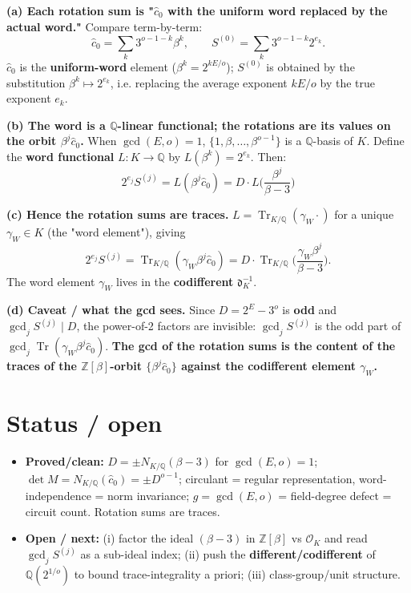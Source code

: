 \documentclass[11pt]{article}
\begin{document}
\textbf{(a) Each rotation sum is "$\hat c_0$ with the uniform word replaced by the actual word."} Compare term-by-term:
\[
\hat c_0 = \sum_{k} 3^{o-1-k} \beta^{k}, \qquad S^{(0)} = \sum_{k} 3^{o-1-k} 2^{e_k}.
\]
$\hat c_0$ is the \textbf{uniform-word} element ($\beta^k=2^{kE/o}$); $S^{(0)}$ is obtained by the substitution $\beta^{k}\mapsto 2^{e_k}$, i.e. replacing the average exponent $kE/o$ by the true exponent $e_k$.

\textbf{(b) The word is a $\mathbb Q$-linear functional; the rotations are its values on the orbit $\beta^j\hat c_0$.} When $\gcd(E,o)=1$, $\{1,\beta,\dots,\beta^{o-1}\}$ is a $\mathbb Q$-basis of $K$. Define the \textbf{word functional} $L:K\to\mathbb Q$ by $L(\beta^k)=2^{e_k}$. Then:
\[
\boxed{2^{e_j} S^{(j)} = L(\beta^{j} \hat c_0) = D \cdot L\Big(\frac{\beta^{j}}{\beta-3}\Big)}
\]

\textbf{(c) Hence the rotation sums are traces.} $L=\operatorname{Tr}_{K/\mathbb Q}(\gamma_W \cdot)$ for a unique $\gamma_W \in K$ (the "word element"), giving
\[
2^{e_j} S^{(j)} = \operatorname{Tr}_{K/\mathbb Q}(\gamma_W \beta^{j} \hat c_0) = D \cdot \operatorname{Tr}_{K/\mathbb Q}\Big(\frac{\gamma_W \beta^{j}}{\beta-3}\Big).
\]
The word element $\gamma_W$ lives in the \textbf{codifferent} $\mathfrak d_K^{-1}$.

\textbf{(d) Caveat / what the gcd sees.} Since $D=2^E-3^o$ is \textbf{odd} and $\gcd_j S^{(j)} \mid D$, the power-of-2 factors are invisible: $\gcd_j S^{(j)}$ is the odd part of $\gcd_j \operatorname{Tr}(\gamma_W \beta^j \hat c_0)$. \textbf{The gcd of the rotation sums is the content of the traces of the $\mathbb Z[\beta]$-orbit $\{\beta^j\hat c_0\}$ against the codifferent element $\gamma_W$.}

\section{Status / open}

\begin{itemize}
    \item \textbf{Proved/clean:} $D=\pm N_{K/\mathbb Q}(\beta-3)$ for $\gcd(E,o)=1$; $\det M=N_{K/\mathbb Q}(\hat c_0) = \pm D^{o-1}$; circulant = regular representation, word-independence = norm invariance; $g=\gcd(E,o)$ = field-degree defect = circuit count. Rotation sums are traces.
    \item \textbf{Open / next:} (i) factor the ideal $(\beta-3)$ in $\mathbb Z[\beta]$ vs $\mathcal O_K$ and read $\gcd_j S^{(j)}$ as a sub-ideal index; (ii) push the \textbf{different/codifferent} of $\mathbb Q(2^{1/o})$ to bound trace-integrality a priori; (iii) class-group/unit structure.
\end{itemize}
\end{document}
